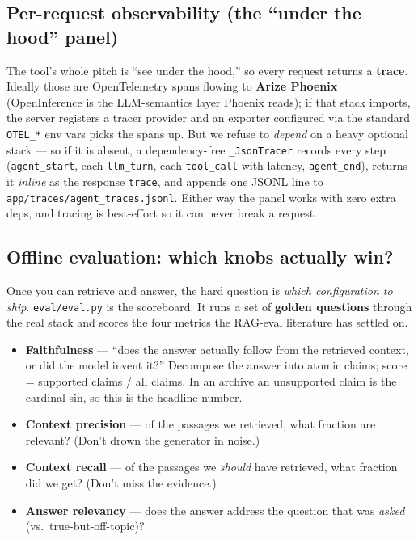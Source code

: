 \documentclass[11pt]{article}
\newcommand{\code}[1]{\texttt{#1}}
\begin{document}
\subsection{Per-request observability (the ``under the hood'' panel)}

The tool's whole pitch is ``see under the hood,'' so every request returns a
\textbf{trace}. Ideally those are OpenTelemetry spans flowing to \textbf{Arize
Phoenix} (OpenInference is the LLM-semantics layer Phoenix reads); if that stack
imports, the server registers a tracer provider and an exporter configured via
the standard \code{OTEL\_*} env vars picks the spans up. But we refuse to
\emph{depend} on a heavy optional stack --- so if it is absent, a dependency-free
\code{\_JsonTracer} records every step (\code{agent\_start}, each
\code{llm\_turn}, each \code{tool\_call} with latency, \code{agent\_end}),
returns it \emph{inline} as the response \code{trace}, and appends one JSONL line
to \code{app/traces/agent\_traces.jsonl}. Either way the panel works with zero
extra deps, and tracing is best-effort so it can never break a request.

\subsection{Offline evaluation: which knobs actually win?}

Once you can retrieve and answer, the hard question is \emph{which configuration
to ship}. \code{eval/eval.py} is the scoreboard. It runs a set of \textbf{golden
questions} through the real stack and scores the four metrics the RAG-eval
literature has settled on.

\begin{primerbox}
\begin{itemize}[leftmargin=1.2em]
  \item \textbf{Faithfulness} --- ``does the answer actually follow from the
        retrieved context, or did the model invent it?'' Decompose the answer
        into atomic claims; score = supported claims / all claims. In an archive
        an unsupported claim is the cardinal sin, so this is the headline number.
  \item \textbf{Context precision} --- of the passages we retrieved, what
        fraction are relevant? (Don't drown the generator in noise.)
  \item \textbf{Context recall} --- of the passages we \emph{should} have
        retrieved, what fraction did we get? (Don't miss the evidence.)
  \item \textbf{Answer relevancy} --- does the answer address the question that
        was \emph{asked} (vs.\ true-but-off-topic)?
\end{itemize}
\end{primerbox}
\end{document}
